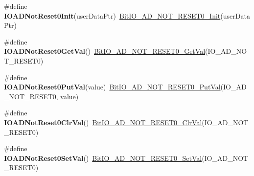 \begin{DoxyCompactItemize}
\item 
\hypertarget{group___func_ala_ga789d49a0ff0be56bef07bfe54c84f3ba}{\#define {\bfseries I\-O\-A\-D\-Not\-Reset0\-Init}(user\-Data\-Ptr)~\hyperlink{group___bit_i_o___a_d___n_o_t___r_e_s_e_t0__module_gab0dee5e91bce634f9f86a6c6bedbae51}{Bit\-I\-O\-\_\-\-A\-D\-\_\-\-N\-O\-T\-\_\-\-R\-E\-S\-E\-T0\-\_\-\-Init}(user\-Data\-Ptr)}\label{group___func_ala_ga789d49a0ff0be56bef07bfe54c84f3ba}

\item 
\hypertarget{group___func_ala_ga86510e810b3e39a28a4e91e6abcb2a9c}{\#define {\bfseries I\-O\-A\-D\-Not\-Reset0\-Get\-Val}()~\hyperlink{group___bit_i_o___a_d___n_o_t___r_e_s_e_t0__module_gaf0c8c2b99922b88ca2cb0cf05a31c839}{Bit\-I\-O\-\_\-\-A\-D\-\_\-\-N\-O\-T\-\_\-\-R\-E\-S\-E\-T0\-\_\-\-Get\-Val}(I\-O\-\_\-\-A\-D\-\_\-\-N\-O\-T\-\_\-\-R\-E\-S\-E\-T0)}\label{group___func_ala_ga86510e810b3e39a28a4e91e6abcb2a9c}

\item 
\hypertarget{group___func_ala_ga0e5dc7e452013af1ceecae50bcdcc71e}{\#define {\bfseries I\-O\-A\-D\-Not\-Reset0\-Put\-Val}(value)~\hyperlink{group___bit_i_o___a_d___n_o_t___r_e_s_e_t0__module_gabd577069a3194532beee8d0523c40f43}{Bit\-I\-O\-\_\-\-A\-D\-\_\-\-N\-O\-T\-\_\-\-R\-E\-S\-E\-T0\-\_\-\-Put\-Val}(I\-O\-\_\-\-A\-D\-\_\-\-N\-O\-T\-\_\-\-R\-E\-S\-E\-T0, value)}\label{group___func_ala_ga0e5dc7e452013af1ceecae50bcdcc71e}

\item 
\hypertarget{group___func_ala_ga4d7c45bab45b07e69148d190b59510a3}{\#define {\bfseries I\-O\-A\-D\-Not\-Reset0\-Clr\-Val}()~\hyperlink{group___bit_i_o___a_d___n_o_t___r_e_s_e_t0__module_gaefb268d1d1d49c8d51163da5d2b410b3}{Bit\-I\-O\-\_\-\-A\-D\-\_\-\-N\-O\-T\-\_\-\-R\-E\-S\-E\-T0\-\_\-\-Clr\-Val}(I\-O\-\_\-\-A\-D\-\_\-\-N\-O\-T\-\_\-\-R\-E\-S\-E\-T0)}\label{group___func_ala_ga4d7c45bab45b07e69148d190b59510a3}

\item 
\hypertarget{group___func_ala_gafe5c8f538c5b1ab19afda7b3e88ce217}{\#define {\bfseries I\-O\-A\-D\-Not\-Reset0\-Set\-Val}()~\hyperlink{group___bit_i_o___a_d___n_o_t___r_e_s_e_t0__module_ga3d566550ab250b5a4fdc2eafb56209bd}{Bit\-I\-O\-\_\-\-A\-D\-\_\-\-N\-O\-T\-\_\-\-R\-E\-S\-E\-T0\-\_\-\-Set\-Val}(I\-O\-\_\-\-A\-D\-\_\-\-N\-O\-T\-\_\-\-R\-E\-S\-E\-T0)}\label{group___func_ala_gafe5c8f538c5b1ab19afda7b3e88ce217}

\end{DoxyCompactItemize}
